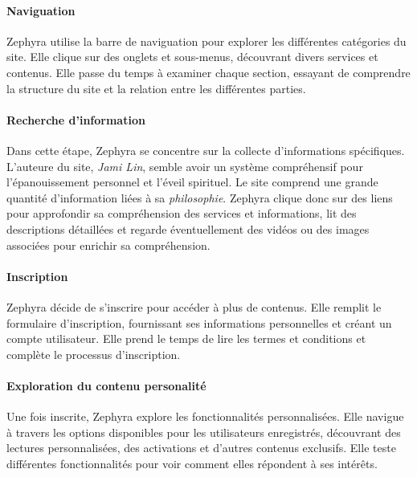 \documentclass[9pt]{report}
\newcommand{\mathpazott}{\fontfamily{pplj}\selectfont}
\renewcommand{\texttt}[1]{{\scriptsize\mathpazott #1}}
\begin{document}
\begin{multicols*}{2}


  \paragraph{Naviguation}
  Zephyra utilise la barre de naviguation pour explorer 
  les différentes catégories du site. Elle clique sur des onglets et 
  sous-menus, découvrant divers services et contenus. 
  Elle passe du temps à examiner chaque section, essayant de 
  comprendre la structure du site et la relation entre les différentes 
  parties.

  \paragraph{Recherche d'information}
  Dans cette étape, 
  Zephyra se concentre sur la collecte d'informations spécifiques. 
  L'auteure du site, \textit{\textit{Jami Lin}}, semble avoir un système  
  compréhensif pour l'épanouissement personnel et l'éveil spirituel. 
  Le site comprend une grande quantité d'information liées à 
  sa \textit{philosophie}. 
  Zephyra clique donc sur des liens pour approfondir sa compréhension des 
  services et  informations, 
  lit des descriptions détaillées et regarde 
  éventuellement des vidéos ou des images associées pour enrichir 
  sa compréhension.




  \paragraph{Inscription}
  Zephyra décide de s'inscrire pour accéder à plus de contenus. Elle 
  remplit le formulaire d'inscription, fournissant ses informations
  personnelles et créant un compte utilisateur. Elle prend le temps de 
  lire les termes et conditions et complète le processus d'inscription.



  \paragraph{Exploration du contenu personalité}
  Une fois inscrite, Zephyra explore les fonctionnalités personnalisées. 
  Elle navigue à travers les options disponibles pour 
  les utilisateurs enregistrés, découvrant des lectures personnalisées, 
  des activations et d'autres contenus exclusifs. Elle teste différentes 
  fonctionnalités pour voir comment elles répondent à ses intérêts.



\end{multicols*}
\end{document}
